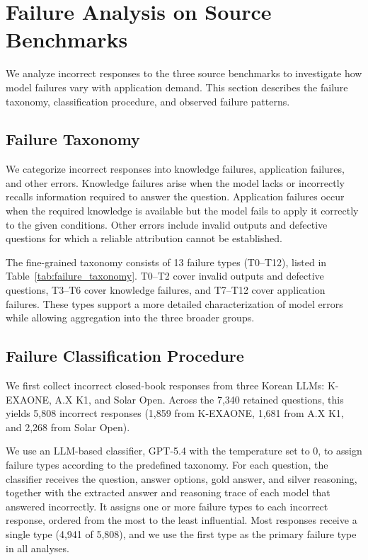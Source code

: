 \section{Failure Analysis on Source Benchmarks}
\label{app:source_failure}

We analyze incorrect responses to the three source benchmarks to investigate how model failures vary with application demand.
This section describes the failure taxonomy, classification procedure, and observed failure patterns.

\subsection{Failure Taxonomy}

We categorize incorrect responses into knowledge failures, application failures, and other errors.
Knowledge failures arise when the model lacks or incorrectly recalls information required to answer the question.
Application failures occur when the required knowledge is available but the model fails to apply it correctly to the given conditions.
Other errors include invalid outputs and defective questions for which a reliable attribution cannot be established.

The fine-grained taxonomy consists of 13 failure types (T0--T12), listed in Table~\ref{tab:failure_taxonomy}.
T0--T2 cover invalid outputs and defective questions, T3--T6 cover knowledge failures, and T7--T12 cover application failures.
These types support a more detailed characterization of model errors while allowing aggregation into the three broader groups.



\subsection{Failure Classification Procedure}

We first collect incorrect closed-book responses from three Korean LLMs: K-EXAONE, A.X K1, and Solar Open.
Across the 7,340 retained questions, this yields 5,808 incorrect responses (1,859 from K-EXAONE, 1,681 from A.X K1, and 2,268 from Solar Open).

We use an LLM-based classifier, GPT-5.4 with the temperature set to 0, to assign failure types according to the predefined taxonomy.
For each question, the classifier receives the question, answer options, gold answer, and silver reasoning, together with the extracted answer and reasoning trace of each model that answered incorrectly.
It assigns one or more failure types to each incorrect response, ordered from the most to the least influential.
Most responses receive a single type (4,941 of 5,808), and we use the first type as the primary failure type in all analyses.

